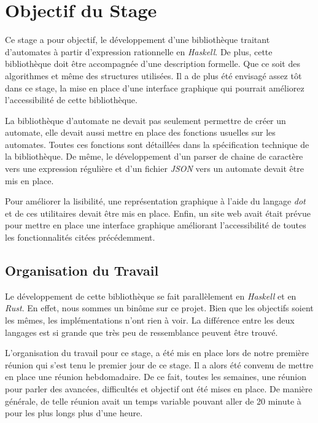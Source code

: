 \section{Objectif du Stage}

Ce stage a pour objectif, le développement d'une bibliothèque traitant 
d'automates à partir d'expression rationnelle en \textit{Haskell}. De plus, 
cette bibliothèque doit être accompagnée d'une description formelle. Que ce soit 
des algorithmes et même des structures utilisées. Il a de plus été envisagé 
assez tôt dans ce stage, la mise en place d'une interface graphique qui pourrait 
améliorez l'accessibilité de cette bibliothèque.

\vphantom{}

La bibliothèque d'automate ne devait pas seulement permettre de créer un 
automate, elle devait aussi mettre en place des fonctions usuelles sur les 
automates. Toutes ces fonctions sont détaillées dans la spécification technique 
de la bibliothèque. De même, le développement d'un parser de chaine de caractère 
vers une expression régulière et d'un fichier \textit{JSON} vers un automate 
devait être mis en place.

\vphantom{}

Pour améliorer la lisibilité, une représentation graphique à l'aide du langage 
\textit{dot} et de ces utilitaires devait être mis en place. Enfin, un site 
web avait était prévue pour mettre en place une interface graphique améliorant 
l'accessibilité de toutes les fonctionnalités citées précédemment. 

\subsection{Organisation du Travail}

Le développement de cette bibliothèque se fait parallèlement en \textit{Haskell}
et en \textit{Rust}. En effet, nous sommes un binôme sur ce projet. Bien que les 
objectifs soient les mêmes, les implémentations n'ont rien à voir. La différence
entre les deux langages est si grande que très peu de ressemblance peuvent être 
trouvé.

\vphantom{}

L'organisation du travail pour ce stage, a été mis en place lors de notre 
première réunion qui s'est tenu le premier jour de ce stage. Il a alors été 
convenu de mettre en place une réunion hebdomadaire. De ce fait, toutes les 
semaines, une réunion pour parler des avancées, difficultés et objectif ont été 
mises en place. De manière générale, de telle réunion avait un temps variable 
pouvant aller de 20 minute à pour les plus longs plus d'une heure.

